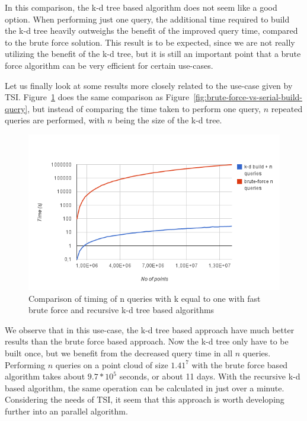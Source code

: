 In this comparison, the k-d tree based algorithm does not seem like a good option. When performing just one query, the additional time required to build the k-d tree heavily outweighs the benefit of the improved query time, compared to the brute force solution. This result is to be expected, since we are not really utilizing the benefit of the k-d tree, but it is still an important point that a brute force algorithm can be very efficient for certain use-cases.

Let us finally look at some results more closely related to the use-case given by TSI\@. Figure~\ref{fig:brute-force-vs-serial-build-n-queries} does the same comparison as Figure~\ref{fig:brute-force-vs-serial-build-query}, but instead of comparing the time taken to perform one query, $n$ repeated queries are performed, with $n$ being the size of the k-d tree.

\begin{figure}[ht!]
    \centering
    \includegraphics[width=120mm]{../gfx/brute-force-vs-serial-build-n-queries.png}
    \caption{Comparison of timing of n queries with k equal to one with fast brute force and recursive k-d tree based algorithms}
    \label{fig:brute-force-vs-serial-build-n-queries}
\end{figure}

We observe that in this use-case, the k-d tree based approach have much better results than the brute force based approach. Now the k-d tree only have to be built once, but we benefit from the decreased query time in all $n$ queries. Performing $n$ queries on a point cloud of size $1.41^7$ with the brute force based algorithm takes about $9.7*10^5$ seconds, or about 11 days. With the recursive k-d based algorithm, the same operation can be calculated in just over a minute. Considering the needs of TSI, it seem that this approach is worth developing further into an parallel algorithm.

